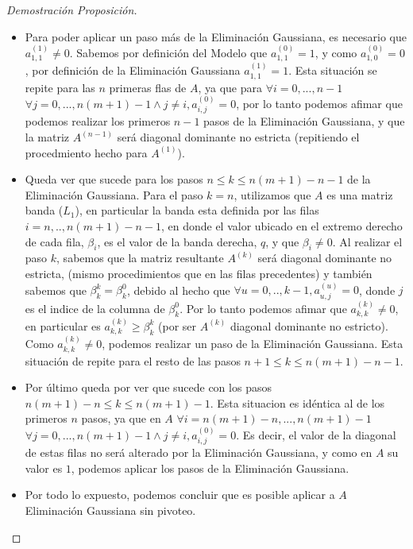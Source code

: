 \begin{proof}[Demostración Proposición]
\begin{itemize}
\item Para poder aplicar un paso más de la Eliminación Gaussiana, es necesario que $a^{(1)}_{1,1} \neq 0$. Sabemos por definición del Modelo que $a^{(0)}_{1,1} = 1$, y como $a^{(0)}_{1,0} = 0$, por definición de la Eliminación Gaussiana $a^{(1)}_{1,1} = 1$. Esta situación se repite para las $n$ primeras flas de $A$, ya que para $\forall i=0,...,n-1$ $\forall j=0,...,n(m+1)-1 \land j \neq i, a^{(0)}_{i,j} = 0$, por lo tanto podemos afimar que podemos realizar los primeros $n-1$ pasos de la Eliminación Gaussiana, y que la matriz $A^{(n-1)}$ será diagonal dominante no estricta (repitiendo el procedmiento hecho para $A^{(1)}$).

\item Queda ver que sucede para los pasos $n \leq k \leq n(m+1)-n-1$ de la Eliminación Gaussiana. Para el paso $k=n$, utilizamos que $A$ es una matriz banda ($L_{1}$), en particular la banda esta definida por las filas $i=n,..,n(m+1)-n-1$, en donde el valor ubicado en el extremo derecho de cada fila, $\beta_{i}$, es el valor de la banda derecha, $q$, y que $\beta_{i} \neq 0$. Al realizar el paso $k$, sabemos que la matriz resultante $A^{(k)}$ será diagonal dominante no estricta, (mismo procedimientos que en las filas precedentes) y también sabemos que $\beta^{k}_{k} = \beta^{0}_{k}$, debido al hecho que $\forall u=0,..,k-1, a^{(u)}_{u,j} = 0$, donde $j$ es el indice de la columna de $\beta^{0}_{k}$. Por lo tanto podemos afimar que $a^{(k)}_{k,k} \neq 0$, en particular es $a^{(k)}_{k,k} \geq \beta^{k}_{k}$ (por ser $A^{(k)}$ diagonal dominante no estricto). Como $a^{(k)}_{k,k} \neq 0$, podemos realizar un paso de la Eliminación Gaussiana. Esta situación de repite para el resto de las pasos $n+1 \leq k \leq n(m+1)-n-1$.

\item Por último queda por ver que sucede con los pasos $ n(m+1)-n \leq k \leq n(m+1)-1$. Esta situacion es idéntica al de los primeros $n$ pasos, ya que en $A$  $\forall i=n(m+1)-n,...,n(m+1)-1$ $\forall j=0,...,n(m+1)-1 \land j \neq i, a^{(0)}_{i,j} = 0$. Es decir, el valor de la diagonal de estas filas no será alterado por la Eliminación Gaussiana, y como en $A$ su valor es $1$, podemos aplicar los pasos de la Eliminación Gaussiana.

\item Por todo lo expuesto, podemos concluir que es posible aplicar a $A$ Eliminación Gaussiana sin pivoteo.

\end{itemize}

\end{proof}
